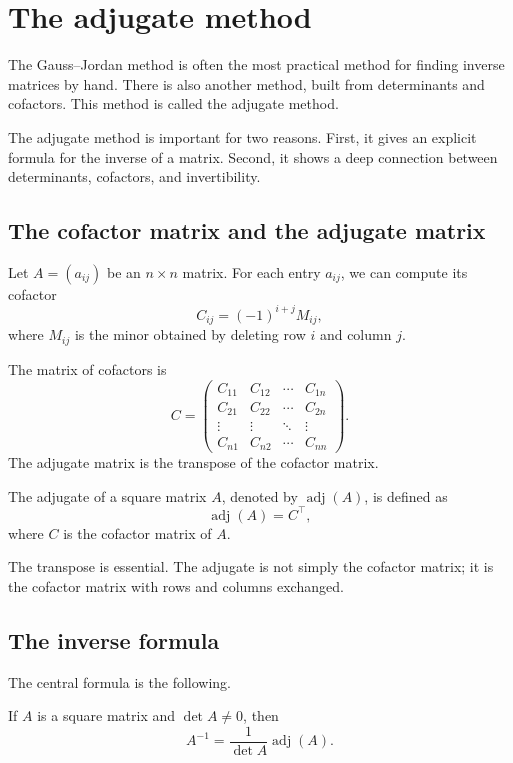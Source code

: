 \section{The adjugate method}

The Gauss--Jordan method is often the most practical method for finding inverse matrices by hand. There is also another method, built from determinants and cofactors. This method is called the adjugate method.

The adjugate method is important for two reasons. First, it gives an explicit formula for the inverse of a matrix. Second, it shows a deep connection between determinants, cofactors, and invertibility.

\subsection{The cofactor matrix and the adjugate matrix}

Let \(A=(a_{ij})\) be an \(n\times n\) matrix. For each entry \(a_{ij}\), we can compute its cofactor
\[
C_{ij}=(-1)^{i+j}M_{ij},
\]
where \(M_{ij}\) is the minor obtained by deleting row \(i\) and column \(j\).

The matrix of cofactors is
\[
C=\begin{pmatrix}
C_{11}&C_{12}&\cdots&C_{1n}\\
C_{21}&C_{22}&\cdots&C_{2n}\\
\vdots&\vdots&\ddots&\vdots\\
C_{n1}&C_{n2}&\cdots&C_{nn}
\end{pmatrix}.
\]
The adjugate matrix is the transpose of the cofactor matrix.

\begin{definitionbox}
The adjugate of a square matrix \(A\), denoted by \(\operatorname{adj}(A)\), is defined as
\[
\operatorname{adj}(A)=C^{\top},
\]
where \(C\) is the cofactor matrix of \(A\).
\end{definitionbox}

The transpose is essential. The adjugate is not simply the cofactor matrix; it is the cofactor matrix with rows and columns exchanged.

\subsection{The inverse formula}

The central formula is the following.

\begin{theorembox}
If \(A\) is a square matrix and \(\det A\ne0\), then
\[
A^{-1}=\frac{1}{\det A}\operatorname{adj}(A).
\]
\end{theorembox}

